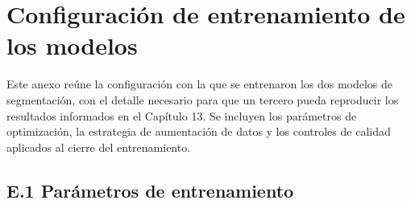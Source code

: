 \chapter{Configuración de entrenamiento de los modelos}
\label{anexo:configuracion-entrenamiento}

Este anexo reúne la configuración con la que se entrenaron los dos modelos de segmentación, con el detalle necesario para que un tercero pueda reproducir los resultados informados en el Capítulo 13. Se incluyen los parámetros de optimización, la estrategia de aumentación de datos y los controles de calidad aplicados al cierre del entrenamiento. %

\section*{E.1 Parámetros de entrenamiento}
\label{anexo:entrenamiento-f1-parametros}

